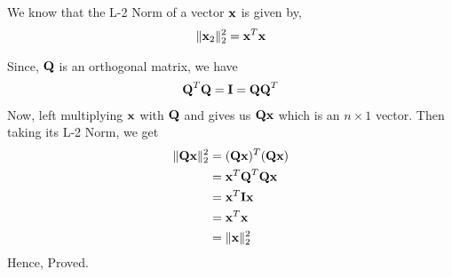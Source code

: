 \documentclass[12pt, a4paper]{article}
\begin{document}
\section{}
We know that the L-2 Norm of a vector $\textbf{x}$ is given by,
\begin{align*}
    \Vert \textbf{x}_2 \Vert^2_2 = \textbf{x}^T \textbf{x}
\end{align*}

Since, $\textbf{Q}$ is an orthogonal matrix, we have
\begin{align*}
    \textbf{Q}^T \textbf{Q} = \textbf{I} =  \textbf{Q} \textbf{Q}^T
\end{align*}
Now, left multiplying $\textbf{x}$ with $\textbf{Q}$ and gives us $\textbf{Q} \textbf{x}$ which is an $n \times 1$ vector. Then taking its L-2 Norm, we get
\begin{align*}
    \Vert \textbf{Q} \textbf{x} \Vert^2_2  &= (\textbf{Q} \textbf{x})^T (\textbf{Q} \textbf{x}) \\
    &= \textbf{x}^T \textbf{Q}^T \textbf{Q} \textbf{x} \\
    &= \textbf{x}^T \textbf{I} \textbf{x} \\
    &= \textbf{x}^T \textbf{x} \\
    &= \Vert \textbf{x} \Vert^2_2 \\
\end{align*}
Hence, Proved.

\newpage

\section{}
\end{document}

